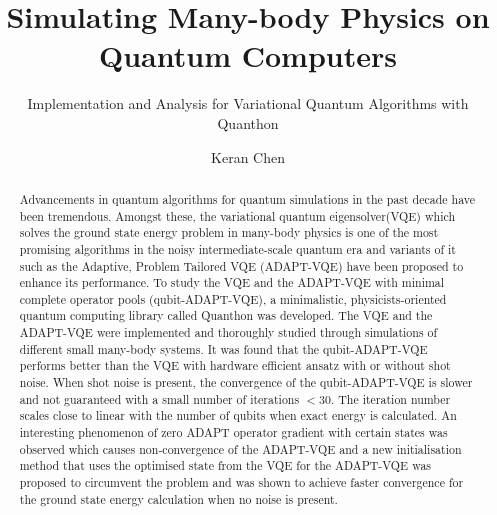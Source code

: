 \documentclass[UKenglish,openany]{uiomasterthesis}  %
\title{Simulating Many-body Physics on Quantum Computers}        %
\subtitle{Implementation and Analysis for Variational Quantum Algorithms with Quanthon}         %
\author{Keran Chen}                      %
\begin{document}
\uiomasterfp[dept={Department of Physics},  %
  program={Physics},                        %
  supervisors={Morten Hjorth-Jensen\and Oskar Leinonen},     %
  long]                                     %

\frontmatter{}
\begin{abstract}
    Advancements in quantum algorithms for quantum simulations in the past decade have been tremendous. Amongst these, the variational quantum eigensolver(VQE) which solves the ground state energy problem in many-body physics is one of the most promising algorithms in the noisy intermediate-scale quantum era and variants of it such as the Adaptive, Problem Tailored VQE (ADAPT-VQE) have been proposed to enhance its performance. To study the VQE and the ADAPT-VQE with minimal complete operator pools (qubit-ADAPT-VQE), a minimalistic, physicists-oriented quantum computing library called Quanthon was developed. The VQE and the ADAPT-VQE were implemented and thoroughly studied through simulations of different small many-body systems. It was found that the qubit-ADAPT-VQE performs better than the VQE with hardware efficient ansatz with or without shot noise. When shot noise is present, the convergence of the qubit-ADAPT-VQE is slower and not guaranteed with a small number of iterations $<30$. The iteration number scales close to linear with the number of qubits when exact energy is calculated. An interesting phenomenon of zero ADAPT operator gradient with certain states was observed which causes non-convergence of the ADAPT-VQE and a new initialisation method that uses the optimised state from the VQE for the ADAPT-VQE was proposed to circumvent the problem and was shown to achieve faster convergence for the ground state energy calculation when no noise is present.
\end{abstract}

\tableofcontents{}                          %
\listoffigures{}                            %
\listoftables{}                             %
\end{document}
